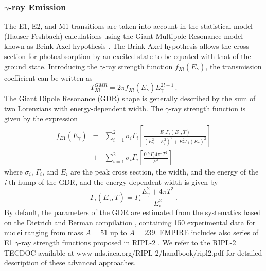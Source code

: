 \documentclass[twocolumn,amsmath,amssymb,10pt,groupedaddress,a4paper]{revtex4}
\begin{document}
\subsubsection{$\gamma$-ray Emission}
The E1, E2, and M1 transitions are taken into account in the statistical
model (Hauser-Feshbach) calculations using
the Giant Multipole Resonance model known as Brink-Axel hypothesis \cite{Axel,Brink,Brinka}.
The Brink-Axel hypothesis allows the cross section for photoabsorption
by an excited state to be equated with that of the ground state. Introducing
the $\gamma$-ray strength function $f_{Xl}(E_{\gamma})$, the transmission
coefficient can be written as
\begin{equation}
T_{Xl}^{GMR}=2\pi f_{Xl}(E_{\gamma})E_{\gamma}^{2l+1}\,.
\label{tgGMR}
\end{equation}
The Giant Dipole Resonance (GDR) shape is generally described by the
sum of two Lorenzians with energy-dependent width. The $\gamma$-ray
strength function is given by the expression
\noindent
\begin{eqnarray}
f_{E1}(E_{\gamma})&=&\sum_{i=1}^{2}\sigma_{i}\Gamma_{i}\left[\frac{E_{\gamma}\Gamma_{i}(E_{\gamma},T)}{(E_{\gamma}^{2}-E_{i}^{2})^{2}+E_{\gamma}^{2}\Gamma_{i}(E_{\gamma})^{2}}\right]\nonumber\\
&+&\sum_{i=1}^{2}\sigma_{i}\Gamma_{i}\left[\frac{0.7\Gamma_{i}4\pi^{2}T^{2}}{E^{5}}\right]
\label{lorenz}
\end{eqnarray}
\noindent where $\sigma_{i}$, $\Gamma_{i}$, and $E_{i}$ are the peak cross
section, the width, and the energy of the \emph{i}-th hump of the
GDR, and the energy dependent width is given by
\begin{equation}
\Gamma_{i}(E_{\gamma},T)=\Gamma_{i}\frac{E_{\gamma}^{2}+4\pi T^{2}}{E_{i}^{2}}\,.
\end{equation}
By default, the parameters of the GDR are estimated from the systematics
based on the Dietrich and Berman compilation \cite{die88}, containing
150 experimental data for nuclei ranging from mass $A=51$ up to $A=239$.
EMPIRE includes also series of E1 $\gamma$-ray strength functions
proposed in RIPL-2 \cite{RIPL2}. We refer to the RIPL-2 TECDOC available
at www-nds.iaea.org/RIPL-2/handbook/ripl2.pdf for detailed description
of these advanced approaches.
\end{document}
